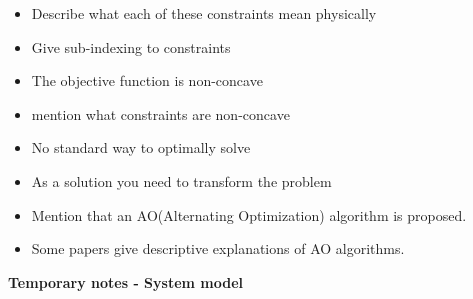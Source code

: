 \documentclass[lettersize,journal]{IEEEtran}
\begin{document}
\begin{itemize}

\item Describe what each of these constraints mean physically
\item Give sub-indexing to constraints
\item The objective function is non-concave
\item mention what constraints are non-concave
\item No standard way to optimally solve
\item As a solution you need to transform the problem
\item Mention that an AO(Alternating Optimization) algorithm is proposed.
\item Some papers give descriptive explanations of AO algorithms.


\end{itemize}

\textbf{Temporary notes - System model}
\end{document}
